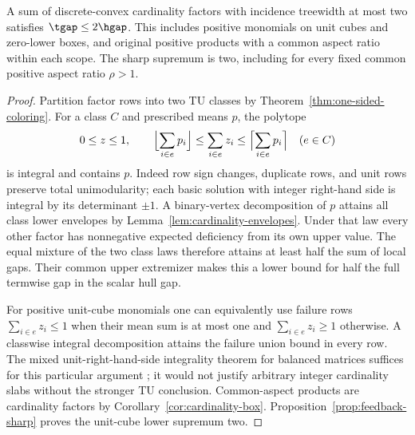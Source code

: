 \begin{theorem}\label{thm:width-two-gap}
A sum of discrete-convex cardinality factors with incidence treewidth
at most two satisfies $\tgap\le2\hgap$. This includes positive
monomials on unit cubes and zero-lower boxes, and original positive
products with a common aspect ratio within each scope. The sharp
supremum is two, including for every fixed common positive aspect ratio
$\rho>1$.
\end{theorem}
\begin{proof}
Partition factor rows into two TU classes by
Theorem~\ref{thm:one-sided-coloring}. For a class $C$ and prescribed
means $p$, the polytope
\[
 0\le z\le1,\qquad
 \Bigl\lfloor\sum_{i\in e}p_i\Bigr\rfloor
 \le\sum_{i\in e}z_i\le
 \Bigl\lceil\sum_{i\in e}p_i\Bigr\rceil\quad(e\in C)
\]
is integral and contains $p$. Indeed row sign changes, duplicate rows,
and unit rows preserve total unimodularity; each basic solution with
integer right-hand side is integral by its determinant $\pm1$.
A binary-vertex decomposition of $p$ attains all class lower envelopes
by Lemma~\ref{lem:cardinality-envelopes}. Under that law every other
factor has nonnegative expected deficiency from its own upper value.
The equal mixture of the two class laws therefore attains at least
half the sum of local gaps. Their common upper extremizer makes this
a lower bound for half the full termwise gap in the scalar hull gap.

For positive unit-cube monomials one can equivalently use failure rows
$\sum_{i\in e}z_i\le1$ when their mean sum is at most one and
$\sum_{i\in e}z_i\ge1$ otherwise. A classwise integral decomposition
attains the failure union bound in every row. The mixed unit-right-hand-side
integrality theorem for balanced matrices suffices for this particular
argument \citep[Theorem 6.13]{Cornuejols2000}; it would not justify
arbitrary integer cardinality slabs without the stronger TU conclusion.
Common-aspect products are cardinality factors by
Corollary~\ref{cor:cardinality-box}. Proposition~\ref{prop:feedback-sharp}
proves the unit-cube lower supremum two.


\end{proof}
